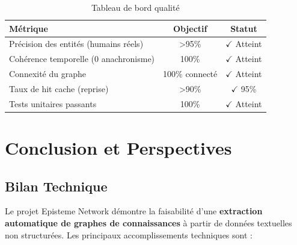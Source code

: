 \documentclass[12pt,a4paper]{report}
\begin{document}
\begin{table}[H]
\centering
\begin{tabular}{|l|c|c|}
\hline
\rowcolor{ice500!20}
\textbf{Métrique} & \textbf{Objectif} & \textbf{Statut} \\
\hline
Précision des entités (humains réels) & >95\% & \textcolor{success}{$\checkmark$ Atteint} \\
\hline
Cohérence temporelle (0 anachronisme) & 100\% & \textcolor{success}{$\checkmark$ Atteint} \\
\hline
Connexité du graphe & 100\% connecté & \textcolor{success}{$\checkmark$ Atteint} \\
\hline
Taux de hit cache (reprise) & >90\% & \textcolor{success}{$\checkmark$ 95\%} \\
\hline
Tests unitaires passants & 100\% & \textcolor{success}{$\checkmark$ Atteint} \\
\hline
\end{tabular}
\caption{Tableau de bord qualité}
\end{table}

\chapter{Conclusion et Perspectives}

\section{Bilan Technique}

Le projet Episteme Network démontre la faisabilité d'une \textbf{extraction automatique de graphes de connaissances} à partir de données textuelles non structurées. Les principaux accomplissements techniques sont :
\end{document}
